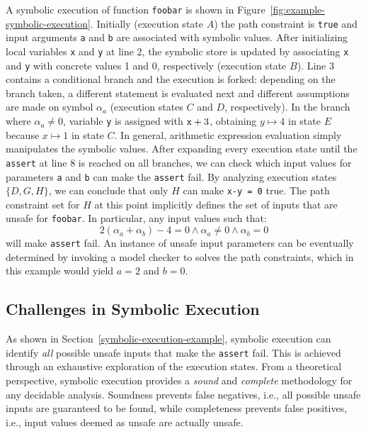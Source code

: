 \noindent A symbolic execution of function {\tt foobar} is shown in Figure~\ref{fig:example-symbolic-execution}. Initially (execution state $A$) the path constraint is {\tt true} and input arguments {\tt a} and {\tt b} are associated with symbolic values. 
After initializing local variables {\tt x} and {\tt y} at line 2, the symbolic store is updated by associating {\tt x} and {\tt y} with concrete values 1 and 0, respectively (execution state $B$). Line 3 contains a conditional branch and the execution is forked: depending on the branch taken, a different statement is evaluated next and different assumptions are made on symbol $\alpha_a$ (execution states $C$ and $D$, respectively). In the branch where $\alpha_a\neq 0$, variable {\tt y} is assigned with ${\tt x}+3$, obtaining $y\mapsto 4$ in state $E$ because $x\mapsto 1$ in state $C$. In general, arithmetic expression evaluation simply manipulates the symbolic values.
After expanding every execution state until the {\tt assert} at line 8 is reached on all branches, we can check which input values for parameters {\tt a} and {\tt b} can make the {\tt assert} fail. By analyzing execution states $\{D,G,H\}$, we can conclude that only $H$ can make {\tt x-y = 0} true. The path constraint set for $H$ at this point implicitly defines the set of inputs that are unsafe for {\tt foobar}. 
In particular, any input values such that:
 \[ 2(\alpha_a+\alpha_b)-4 = 0 \wedge \alpha_a \neq 0 \wedge \alpha_b = 0 \]
will make {\tt assert} fail. An instance of unsafe input parameters can be eventually determined by invoking a model checker to solves the path constraints, which in this example would yield $a = 2$ and $b = 0$. 


\subsection{Challenges in Symbolic Execution}
\label{example-discussion}

As shown in Section~\ref{symbolic-execution-example}, symbolic execution can identify {\em all} possible unsafe inputs that make the {\tt assert} fail. This is achieved through an exhaustive exploration of the execution states. From a theoretical perspective, symbolic execution provides a {\em sound} and {\em complete} methodology for any decidable analysis. Soundness prevents false negatives, i.e., all possible unsafe inputs are guaranteed to be found, while completeness prevents false positives, i.e.,  input values deemed as unsafe are actually unsafe. 

